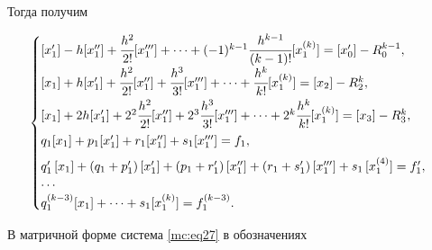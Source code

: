 Тогда получим

\begin{gather}

\label{mc:eq27}

\begin{cases}

[x_1']-h [x''_1]+\cfrac{h^{2}}{2!} [x_{1}''']+\dots+(-1)^{k-1}\cfrac{h^{k-1}}{(k-1)!} [x_1^{(k)}]=[x_{0}']-R_{0}^{k-1},\\[2mm]

[x_1]+h[x_1']+\cfrac{h^2}{2!} [x''_1]+\cfrac{h^3}{3!} [x'''_1]+\dots+\cfrac{h^k}{k!} [x_1^{(k)}]=[x_{2}]-R_{2}^k,\\[2mm]

[x_1]+2h[x_1']+2^2\cfrac{h^2}{2!} [x''_1]+2^3\cfrac{h^3}{3!} [x'''_1]+\dots+2^k\cfrac{h^k}{k!} [x_1^{(k)}]=[x_{3}]-R_{3}^k,

\\[2mm]

  q_1 [x_1]+p_1 [x'_1]+r_1 [x''_1]+s_1 [x'''_1]=f_1,

\\[2mm]

  q_1'\,[x_1]+(q_1+p_1')\,[x'_1]+(p_1+r_1')\,[x''_1]+(r_1+s_1')\,[x'''_1]+s_1\,[x_1^{(4)}]=f_1',

\\

\cdots

\\

  q_1^{(k-3)} [x_1]+\dots+s_1 [x_1^{(k)}]=f_1^{(k-3)}.

\end{cases}

\end{gather}

В матричной форме система \eqref{mc:eq27} в обозначениях




